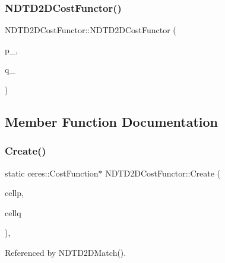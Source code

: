 \subsubsection{\texorpdfstring{N\+D\+T\+D2\+D\+Cost\+Functor()}{NDTD2DCostFunctor()}}
{\footnotesize\ttfamily N\+D\+T\+D2\+D\+Cost\+Functor\+::\+N\+D\+T\+D2\+D\+Cost\+Functor (\begin{DoxyParamCaption}\item[{const \hyperlink{classNDTCell}{N\+D\+T\+Cell} $\ast$}]{p\+\_\+,  }\item[{const \hyperlink{classNDTCell}{N\+D\+T\+Cell} $\ast$}]{q\+\_\+ }\end{DoxyParamCaption})\hspace{0.3cm}{\ttfamily [inline]}}



\subsection{Member Function Documentation}
\mbox{\label{structNDTD2DCostFunctor_abfefc323f0a38cca04f81af714a3912a}} 
\subsubsection{\texorpdfstring{Create()}{Create()}}
{\footnotesize\ttfamily static ceres\+::\+Cost\+Function$\ast$ N\+D\+T\+D2\+D\+Cost\+Functor\+::\+Create (\begin{DoxyParamCaption}\item[{const \hyperlink{classNDTCell}{N\+D\+T\+Cell} $\ast$}]{cellp,  }\item[{const \hyperlink{classNDTCell}{N\+D\+T\+Cell} $\ast$}]{cellq }\end{DoxyParamCaption})\hspace{0.3cm}{\ttfamily [inline]}, {\ttfamily [static]}}



Referenced by N\+D\+T\+D2\+D\+Match().

\mbox{\label{structNDTD2DCostFunctor_afab24c89580155b7ead21cfb111e22fb}} 
